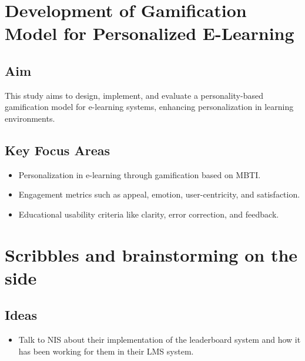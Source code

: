 \documentclass{article}
\begin{document}
\newpage
\section{Development of Gamification Model for Personalized E-Learning}

\subsection{Aim}
This study aims to design, implement, and evaluate a personality-based gamification model for e-learning systems, enhancing personalization in learning environments.

\subsection{Key Focus Areas}
\begin{itemize}
    \item Personalization in e-learning through gamification based on MBTI.
    \item Engagement metrics such as appeal, emotion, user-centricity, and satisfaction.
    \item Educational usability criteria like clarity, error correction, and feedback.
\end{itemize}

\newpage


\newpage
\section{Scribbles and brainstorming on the side}

\subsection{Ideas}
\begin{itemize}
    \item Talk to NIS about their implementation of the leaderboard system and how it has been working for them in their LMS system.
\end{itemize}
\end{document}

